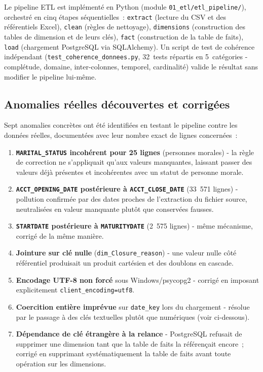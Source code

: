 \documentclass[11pt,a4paper]{report}
\begin{document}
Le pipeline ETL est impl\'ement\'e en Python (module \texttt{01\_etl/etl\_pipeline/}),
orchestr\'e en cinq \'etapes s\'equentielles~: \texttt{extract} (lecture du CSV et
des r\'ef\'erentiels Excel), \texttt{clean} (r\`egles de nettoyage), 
\texttt{dimensions} (construction des tables de dimension et de leurs cl\'es),
\texttt{fact} (construction de la table de faits), \texttt{load} (chargement
PostgreSQL via SQLAlchemy). Un script de test de coh\'erence ind\'ependant
(\texttt{test\_coherence\_donnees.py}, 32~tests r\'epartis en 5~cat\'egories -
compl\'etude, domaine, inter-colonnes, temporel, cardinalit\'e) valide le
r\'esultat sans modifier le pipeline lui-m\^eme.

\subsection{Anomalies r\'eelles d\'ecouvertes et corrig\'ees}
\label{sec:bugs-etl}

Sept anomalies concr\`etes ont \'et\'e identifi\'ees en testant le pipeline contre
les donn\'ees r\'eelles, document\'ees avec leur nombre exact de lignes
concern\'ees~:

\begin{enumerate}
\item \textbf{\texttt{MARITAL\_STATUS} incoh\'erent pour 25 lignes} (personnes
      morales) - la r\`egle de correction ne s'appliquait qu'aux valeurs
      manquantes, laissant passer des valeurs d\'ej\`a pr\'esentes et
      incoh\'erentes avec un statut de personne morale.
\item \textbf{\texttt{ACCT\_OPENING\_DATE} post\'erieure \`a
      \texttt{ACCT\_CLOSE\_DATE}} (33~571 lignes) - pollution confirm\'ee par
      des dates proches de l'extraction du fichier source, neutralis\'ees en
      valeur manquante plut\^ot que conserv\'ees fausses.
\item \textbf{\texttt{STARTDATE} post\'erieure \`a \texttt{MATURITYDATE}}
      (2~575 lignes) - m\^eme m\'ecanisme, corrig\'e de la m\^eme mani\`ere.
\item \textbf{Jointure sur cl\'e nulle} (\texttt{dim\_Closure\_reason}) -
      une valeur nulle c\^ot\'e r\'ef\'erentiel produisait un produit cart\'esien et
      des doublons en cascade.
\item \textbf{Encodage UTF-8 non forc\'e} sous Windows/psycopg2 - corrig\'e
      en imposant explicitement \texttt{client\_encoding=utf8}.
\item \textbf{Coercition enti\`ere impr\'evue} sur \texttt{date\_key} lors du
      chargement - r\'esolue par le passage \`a des cl\'es textuelles plut\^ot
      que num\'eriques (voir ci-dessous).
\item \textbf{D\'ependance de cl\'e \'etrang\`ere \`a la relance} - PostgreSQL
      refusait de supprimer une dimension tant que la table de faits la
      r\'ef\'eren\c{c}ait encore~; corrig\'e en supprimant syst\'ematiquement la
      table de faits avant toute op\'eration sur les dimensions.
\end{enumerate}
\end{document}
